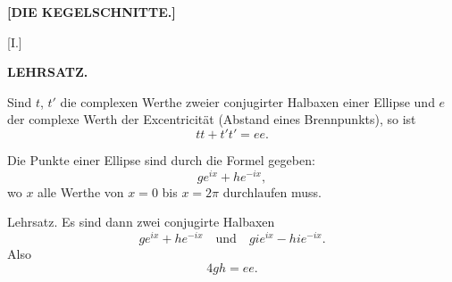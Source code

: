 \clearpage{}

\begin{center}
\textbf{[DIE KEGELSCHNITTE.]}
\end{center}

\begin{center}
[I.]

\textbf{LEHRSATZ.}
\end{center}

Sind $t$, $t'$ die complexen Werthe zweier conjugirter Halbaxen einer
Ellipse und $e$ der complexe Werth der Excentricität (Abstand eines
Brennpunkts), so ist
\[
tt + t't' = ee.
\]

Die Punkte einer Ellipse sind durch die Formel gegeben:
\[
g e^{ix} + h e^{-ix},
\]
wo $x$ alle Werthe von $x = 0$ bis $x = 2\pi$ durchlaufen muss.

Lehrsatz. Es sind dann zwei conjugirte Halbaxen
\[
g e^{ix} + h e^{-ix} \quad \text{und} \quad g i e^{ix} - h i e^{-ix}.
\]
Also
\[
4gh = ee.
\]
